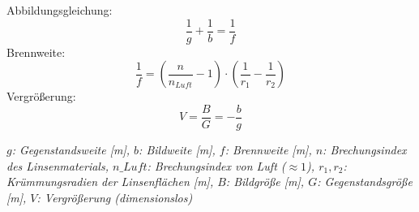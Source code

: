 \documentclass[a4paper,10pt]{article}
\newenvironment{displayformula}
{
	\begin{framed}
		\color{formulaColor}
	}
	{\end{framed}}
\newcommand{\formulalegend}[1]{%
	\par\vspace{0.5ex}%
	{{\color{legendColor}\RaggedRight\small\textit{#1}}}%
	\par\vspace{1.5ex}%
}
\begin{document}
\begin{displayformula}
	Abbildungsgleichung:
	\[
	\frac{1}{g} + \frac{1}{b} = \frac{1}{f}
	\]
	Brennweite:
	\[
	\frac{1}{f} = (\frac{n}{n_{Luft}} -1) \cdot (\frac{1}{r_1} - \frac{1}{r_2})
	\]
	Vergrößerung:
	\[
	V = \frac{B}{G} = -\frac{b}{g}
	\]
\end{displayformula}
\formulalegend{
	\( g \): Gegenstandsweite [m], 
	\( b \): Bildweite [m], 
	\( f \): Brennweite [m], 
	\( n \): Brechungsindex des Linsenmaterials, 
	\( n\_{Luft} \): Brechungsindex von Luft (\(\approx 1\)), 
	\( r_1, r_2 \): Krümmungsradien der Linsenflächen [m], 
	\( B \): Bildgröße [m], 
	\( G \): Gegenstandsgröße [m], 
	\( V \): Vergrößerung (dimensionslos)
}
\end{document}
